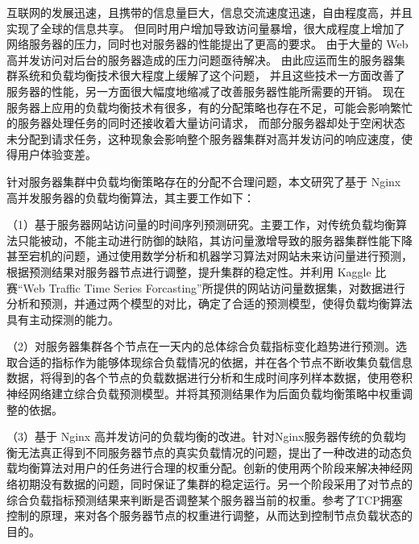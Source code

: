 \begin{cabstract}

互联网的发展迅速，且携带的信息量巨大，信息交流速度迅速，自由程度高，并且实现了全球的信息共享。
但同时用户增加导致访问量暴增，很大成程度上增加了网络服务器的压力，同时也对服务器的性能提出了更高的要求。
由于大量的 Web 高并发访问对后台的服务器造成的压力问题亟待解决。
由此应运而生的服务器集群系统和负载均衡技术很大程度上缓解了这个问题，
并且这些技术一方面改善了服务器的性能，另一方面很大幅度地缩减了改善服务器性能所需要的开销。
现在服务器上应用的负载均衡技术有很多，有的分配策略也存在不足，可能会影响繁忙的服务器处理任务的同时还接收着大量访问请求，
而部分服务器却处于空闲状态未分配到请求任务，这种现象会影响整个服务器集群对高并发访问的响应速度，使得用户体验变差。

针对服务器集群中负载均衡策略存在的分配不合理问题，本文研究了基于 Nginx 高并发服务器的负载均衡算法，其主要工作如下：

（1）基于服务器网站访问量的时间序列预测研究。主要工作，对传统负载均衡算法只能被动，不能主动进行防御的缺陷，其访问量激增导致的服务器集群性能下降甚至宕机的问题，通过使用数学分析和机器学习算法对网站未来访问量进行预测，根据预测结果对服务器节点进行调整，提升集群的稳定性。并利用 Kaggle 比赛“Web Traffic Time Series Forcasting”所提供的网站访问量数据集，对数据进行分析和预测，并通过两个模型的对比，确定了合适的预测模型，使得负载均衡算法具有主动探测的能力。

（2）对服务器集群各个节点在一天内的总体综合负载指标变化趋势进行预测。选取合适的指标作为能够体现综合负载情况的依据，并在各个节点不断收集负载信息数据，将得到的各个节点的负载数据进行分析和生成时间序列样本数据，使用卷积神经网络建立综合负载预测模型。并将其预测结果作为后面负载均衡策略中权重调整的依据。

（3）基于 Nginx 高并发访问的负载均衡的改进。针对Nginx服务器传统的负载均衡无法真正得到不同服务器节点的真实负载情况的问题，提出了一种改进的动态负载均衡算法对用户的任务进行合理的权重分配。创新的使用两个阶段来解决神经网络初期没有数据的问题，同时保证了集群的稳定运行。另一个阶段采用了对节点的综合负载指标预测结果来判断是否调整某个服务器当前的权重。参考了TCP拥塞控制的原理，来对各个服务器节点的权重进行调整，从而达到控制节点负载状态的目的。

\end{cabstract}

